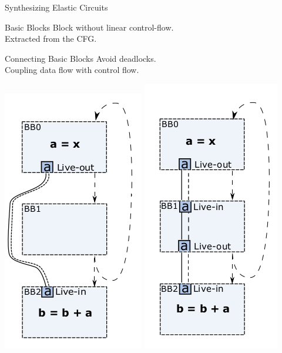 \documentclass[page number]{beamer}
\begin{document}
\begin{frame}{Synthesizing Elastic Circuits}
  \begin{block}{Basic Blocks}
    Block without linear control-flow.\\
    Extracted from the CFG.
  \end{block}
  \vfill
  \begin{block}{Connecting Basic Blocks}
    Avoid deadlocks.\\
    Coupling data flow with control flow.
  \end{block}
  \vfill
  \vspace{-5pt}
  \begin{center}
    \includegraphics[scale=0.3]{wrong.png}
    \quad\quad
    \includegraphics[scale=0.3]{right.png}
  \end{center}
      
\end{frame}
\end{document}
